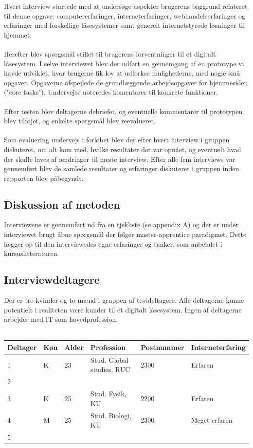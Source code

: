 \documentclass[a4paper,12pt]{article}
\begin{document}
Hvert interview startede med at undersøge aspekter brugerens baggrund relateret til denne opgave:
computererfaringer, interneterfaringer, webhandelserfaringer og erfaringer med forskellige låsesystemer samt generelt internetstyrede løsninger til hjemmet.
\\ \\
Herefter blev spørgsmål stillet til brugerens forventninger til et digitalt låsesystem.
I selve interviewet blev der udført en gennemgang af en prototype vi havde udviklet, hvor brugerne fik lov at udforkse mulighederne, med nogle små opgaver.
Opgaverne afspejlede de grundlæggende arbejdsopgaver for hjemmesiden ("core tasks"). Undervejse noteredes komentarer til konkrete funktioner.
\\ \\
Efter testen blev deltagerne debriefet, og eventuelle kommentarer til prototypen blev tilføjet, og enkelte spørgsmål blev reevalueret.
\\ \\
Som evaluering undervejs i forløbet blev der efter hvert interview i gruppen diskuteret, om alt
kom med, hvilke resultater der var opnået, og eventuelt hvad der skulle laves af ændringer til
næste interview. Efter alle fem interviews var gennemført blev de samlede resultater og erfaringer
diskuteret i gruppen inden rapporten blev påbegyndt.


\subsection{Diskussion af metoden}

Interviewene er gennemført ud fra en tjekliste (se appendix A) og der er under interviewet brugt
åbne spørgsmål der følger master-apprentice paradigmet. Dette lægger op til den interviewedes
egne erfaringer og tanker, som anbefalet i kursuslitteraturen.


\subsection{Interviewdeltagere}

Der er tre kvinder og to mænd i gruppen af testdeltagere. Alle deltagerne kunne potentielt i
realiteten være kunder til et digitalt låsesystem. Ingen af deltagerne arbejder med IT som
hovedprofession.
\\  \\
\begin{tabular}{|l|l|l|l|l|l|}
	\hline Deltager & Køn & Alder & Profession & Postnummer & Interneterfaring \\
	\hline 1 & K & 23  & Stud. Global studies, RUC & 2300 & Erfaren \\
	\hline 2 & & & & & \\
	\hline 3 & K & 25 & Stud. Fysik, KU & 2200 & Erfaren \\
	\hline 4 & M & 25 & Stud. Biologi, KU & 2300 & Meget erfaren \\
	\hline 5 & & & & & \\
	\hline
\end{tabular}
\\ \\
\end{document}
